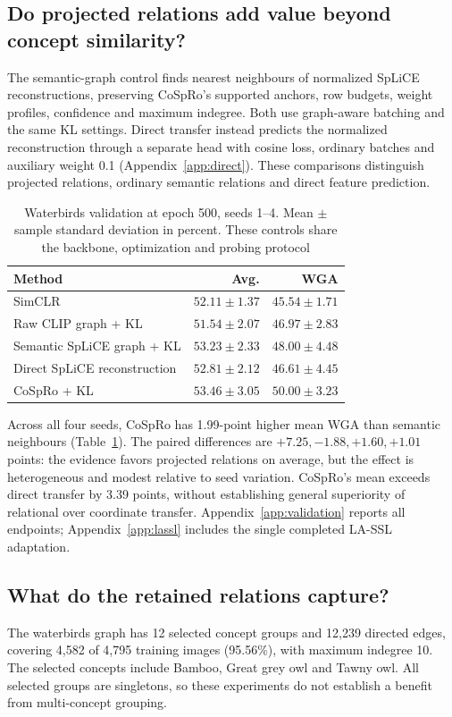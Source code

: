 \documentclass{article}
\begin{document}
\subsection{Do projected relations add value beyond concept similarity?}
The semantic-graph control finds nearest neighbours of normalized SpLiCE reconstructions, preserving CoSpRo's supported anchors, row budgets, weight profiles, confidence and maximum indegree. Both use graph-aware batching and the same KL settings. Direct transfer instead predicts the normalized reconstruction through a separate head with cosine loss, ordinary batches and auxiliary weight 0.1 (Appendix~\ref{app:direct}). These comparisons distinguish projected relations, ordinary semantic relations and direct feature prediction.

\begin{table}[htbp]
\centering
\caption{Waterbirds validation at epoch 500, seeds 1--4. Mean $\pm$ sample standard deviation in percent. These controls share the backbone, optimization and probing protocol}
\begin{tabular}{lrr}
\toprule
Method & Avg. & WGA \\
\midrule
SimCLR & $52.11\pm1.37$ & $45.54\pm1.71$ \\
Raw CLIP graph + KL & $51.54\pm2.07$ & $46.97\pm2.83$ \\
Semantic SpLiCE graph + KL & $53.23\pm2.33$ & $48.00\pm4.48$ \\
Direct SpLiCE reconstruction & $52.81\pm2.12$ & $46.61\pm4.45$ \\
CoSpRo + KL & $53.46\pm3.05$ & $50.00\pm3.23$ \\
\bottomrule
\end{tabular}
\label{tab:semantic}
\end{table}

Across all four seeds, CoSpRo has 1.99-point higher mean WGA than semantic neighbours (Table~\ref{tab:semantic}). The paired differences are $+7.25,-1.88,+1.60,+1.01$ points: the evidence favors projected relations on average, but the effect is heterogeneous and modest relative to seed variation. CoSpRo's mean exceeds direct transfer by 3.39 points, without establishing general superiority of relational over coordinate transfer. Appendix~\ref{app:validation} reports all endpoints; Appendix~\ref{app:lassl} includes the single completed LA-SSL adaptation.

\subsection{What do the retained relations capture?}
The waterbirds graph has 12 selected concept groups and 12,239 directed edges, covering 4,582 of 4,795 training images (95.56\%), with maximum indegree 10. The selected concepts include Bamboo, Great grey owl and Tawny owl. All selected groups are singletons, so these experiments do not establish a benefit from multi-concept grouping.
\end{document}
